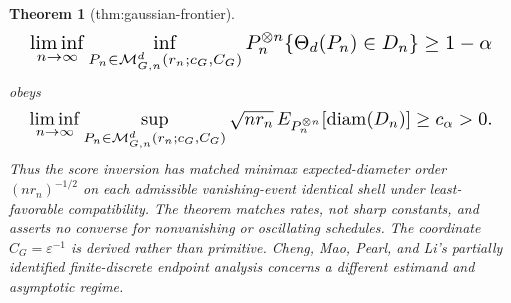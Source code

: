 \documentclass{article}
\newtheorem{theorem}{Theorem}
\begin{document}
\begin{theorem}[thm:gaussian-frontier]
\[
\makebox[\linewidth][c]{\resizebox{0.98\linewidth}{!}{\par\noindent \makebox[\linewidth][c]{\resizebox{0.98\linewidth}{!}{\(\displaystyle \displaystyle \liminf_{n\to\infty}\inf_{P_n\in\mathcal M_{G,n}^d(r_n;c_G,C_G)}P_n^{\otimes n}\{\Theta_d(P_n)\in D_n\}\ge1-\alpha\)}}\par\noindent}}
\]
obeys
\[
\makebox[\linewidth][c]{\resizebox{0.98\linewidth}{!}{\par\noindent \makebox[\linewidth][c]{\resizebox{0.98\linewidth}{!}{\(\displaystyle \displaystyle \liminf_{n\to\infty}\sup_{P_n\in\mathcal M_{G,n}^d(r_n;c_G,C_G)}\sqrt{nr_n}\,E_{P_n^{\otimes n}}[\operatorname{diam}(D_n)]\ge c_\alpha>0.\)}}\par\noindent}}
\]
Thus the score inversion has matched minimax expected-diameter order \((nr_n)^{-1/2}\) on each admissible vanishing-event identical shell under least-favorable compatibility. The theorem matches rates, not sharp constants, and asserts no converse for nonvanishing or oscillating schedules. The coordinate \(C_G=\varepsilon^{-1}\) is derived rather than primitive. Cheng, Mao, Pearl, and Li's partially identified finite-discrete endpoint analysis concerns a different estimand and asymptotic regime.
\end{theorem}
\end{document}

